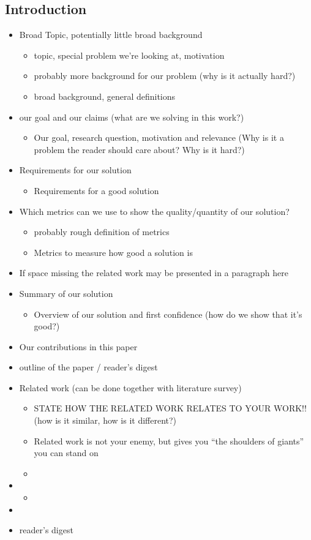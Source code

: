 \documentclass{article}
\begin{document}
\subsection{Introduction}
\begin{itemize}
	\item Broad Topic, potentially little broad background
	\begin{itemize}
		\item topic, special problem we're looking at, motivation
		\item probably more background for our problem (why is it actually hard?) 
		\item broad background, general definitions
	\end{itemize}
	\item our goal and our claims (what are we solving in this work?)
	\begin{itemize}
		\item Our goal, research question, motivation and relevance (Why is it a problem the reader should care about? Why is it hard?)
	\end{itemize}
	\item Requirements for our solution
	\begin{itemize}
		\item Requirements for a good solution
	\end{itemize}
	\item Which metrics can we use to show the quality/quantity of our solution?
	\begin{itemize}
		\item probably rough definition of metrics
		\item Metrics to measure how good a solution is
	\end{itemize}
	\item If space missing the related work may be presented in a paragraph here
	\item Summary of our solution
	\begin{itemize}
		\item Overview of our solution and first confidence (how do we show that it's good?)
	\end{itemize}
	\item Our contributions in this paper
	\item outline of the paper / reader's digest
	\item Related work (can be done together with literature survey)
	\begin{itemize}
		\item STATE HOW THE RELATED WORK RELATES TO YOUR WORK!! (how is it similar, how is it different?)
		\item Related work is not your enemy, but gives you ``the shoulders of giants'' you can stand on
		\item 
	\end{itemize}
	\item 
	\begin{itemize}
		\item 
	\end{itemize}
	\item 
	\item reader's digest
\end{itemize}
\end{document}
